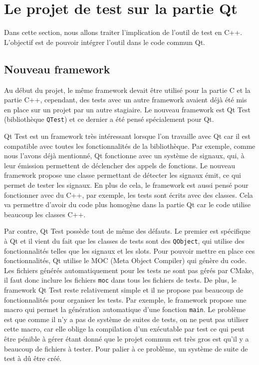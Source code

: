 \documentclass[a4paper]{article}
\begin{document}
\section{Le projet de test sur la partie Qt}%

Dans cette section, nous allons traiter l'implication de l'outil de test en
C++. L'objectif est de pouvoir intégrer l'outil dans le code commun Qt.

\subsection{Nouveau framework}
\label{nouvframe}

Au début du projet, le même framework devait être utilisé pour la partie C et la
partie C++, cependant, des tests avec un autre framework avaient déjà été mis en
place sur un projet par un autre stagiaire. Le nouveau framework est Qt Test
(bibliothèque \verb|QTest|) et ce dernier a été pensé spécialement pour Qt.

Qt Test est un framework très intéressant lorsque l'on travaille avec Qt car il
est compatible avec toutes les fonctionnalités de la bibliothèque. Par exemple,
comme nous l'avons déjà mentionné, Qt fonctionne avec un système de signaux,
qui, à leur émission permettent de déclencher des appels de fonctions. Le
nouveau framework propose une classe permettant de détecter les signaux émit, ce
qui permet de tester les signaux. En plus de cela, le framework est aussi pensé
pour fonctionner avec du C++, par exemple, les tests sont écrits avec des
classes. Cela va permettre d'avoir du code plus homogène dans la partie Qt car
le code utilise beaucoup les classes C++.

Par contre, Qt Test possède tout de même des défauts. Le premier est spécifique
à Qt et il vient du fait que les classes de tests sont des \verb|QObject|, qui
utilise des fonctionnalités telles que les signaux et les \gls{slots}. Pour
pouvoir mettre en place ces fonctionnalités, Qt utilise le MOC (Meta Object
Compiler) qui génère du code. Les fichiers générés automatiquement pour les
tests ne sont pas gérés par CMake, il faut donc inclure les fichiers \verb|moc|
dans tous les fichiers de tests. De plus, le framework Qt Test reste
relativement simple et il ne propose pas beaucoup de fonctionnalités pour
organiser les tests. Par exemple, le framework propose une macro qui permet la
génération automatique d'une fonction \verb|main|. Le problème est que comme il
n'y a pas de système de suites de tests, on ne peut pas utiliser cette macro, car
elle oblige la compilation d'un exécutable par test ce qui peut être pénible à
gérer étant donné que le projet commun est très gros est qu'il y a beaucoup de
fichiers à tester. Pour palier à ce problème, un système de suite de test à dû
être créé.
\end{document}
